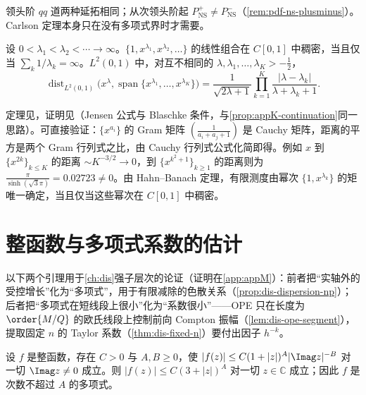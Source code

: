 领头阶 $qq$ 道两种延拓相同；从次领头阶起 $P^+_{\mathrm{NS}}\ne P^-_{\mathrm{NS}}$（\cref{rem:pdf-ns-plusminus}）。Carlson 定理本身只在没有多项式界时才需要。

\begin{theorem}\label{thm:appK-muntz}
设 $0<\lambda_1<\lambda_2<\cdots\to\infty$。$\{1,x^{\lambda_1},x^{\lambda_2},\dots\}$ 的线性组合在 $C[0,1]$ 中稠密，当且仅当 $\sum_k1/\lambda_k=\infty$。$L^2(0,1)$ 中，对互不相同的 $\lambda,\lambda_1,\dots,\lambda_K>-\frac12$，
\begin{equation}\label{eq:appK-muntz}
\operatorname{dist}_{L^2(0,1)}\big(x^\lambda,\operatorname{span}\{x^{\lambda_1},\dots,x^{\lambda_K}\}\big)=\frac{1}{\sqrt{2\lambda+1}}\prod_{k=1}^K\frac{|\lambda-\lambda_k|}{\lambda+\lambda_k+1}.
\end{equation}
\end{theorem}

定理见\cite{Muntz1914,Szasz1916}，证明见\cite[第~15.25--15.27~节]{Rudin1987}（Jensen 公式与 Blaschke 条件，与\cref{prop:appK-continuation}同一思路）。可直接验证：$\{x^{a_i}\}$ 的 Gram 矩阵 $(\frac1{a_i+a_j+1})$ 是 Cauchy 矩阵，距离的平方是两个 Gram 行列式之比，由 Cauchy 行列式公式化简即得。例如 $x$ 到 $\{x^{2k}\}_{k\le K}$ 的距离 $\sim K^{-3/2}\to0$，到 $\{x^{k^2+1}\}_{k\ge1}$ 的距离则为 $\frac{\pi}{\sinh(\sqrt3\pi)}=0.02723\ne0$。由 Hahn--Banach 定理，有限测度由幂次 $\{1,x^{\lambda_k}\}$ 的矩唯一确定，当且仅当这些幂次在 $C[0,1]$ 中稠密。

\section{整函数与多项式系数的估计}\label{sec:appK-entire}

以下两个引理用于\cref{ch:dis}强子层次的论证（证明在\cref{app:appM}）：前者把“实轴外的受控增长”化为“多项式”，用于有限减除的色散关系（\cref{prop:dis-dispersion-np}）；后者把“多项式在短线段上很小”化为“系数很小”——OPE 只在长度为 $\order{M/Q}$ 的欧氏线段上控制前向 Compton 振幅（\cref{lem:dis-ope-segment}），提取固定 $n$ 的 Taylor 系数（\cref{thm:dis-fixed-n}）要付出因子 $h^{-k}$。

\begin{lemma}[受控增长的整函数]\label{lem:appK-entire}
设 $f$ 是整函数，存在 $C>0$ 与 $A,B\ge0$，使 $|f(z)|\le C(1+|z|)^A|\Imag z|^{-B}$ 对一切 $\Imag z\ne0$ 成立。则 $|f(z)|\le C(3+|z|)^A$ 对一切 $z\in\mathbb C$ 成立；因此 $f$ 是次数不超过 $A$ 的多项式。
\end{lemma}

